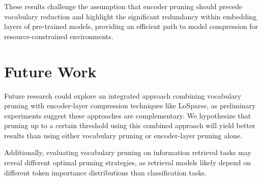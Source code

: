\documentclass[twocolumn]{article}
\begin{document}
These results challenge the assumption that encoder pruning should precede vocabulary reduction and highlight the significant redundancy within embedding layers of pre-trained models, providing an efficient path to model compression for resource-constrained environments.

\section{Future Work}
Future research could explore an integrated approach combining vocabulary pruning with encoder-layer compression techniques like LoSparse, as preliminary experiments suggest these approaches are complementary. We hypothesize that pruning up to a certain threshold using this combined approach will yield better results than using either vocabulary pruning or encoder-layer pruning alone.

Additionally, evaluating vocabulary pruning on information retrieval tasks may reveal different optimal pruning strategies, as retrieval models likely depend on different token importance distributions than classification tasks.




\end{document}
